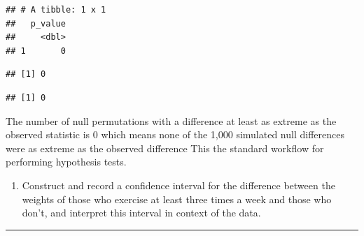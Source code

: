 \documentclass[
]{article}
\newenvironment{Shaded}{\begin{snugshade}}{\end{snugshade}}
\newcommand{\DecValTok}[1]{\textcolor[rgb]{0.00,0.00,0.81}{#1}}
\newcommand{\FunctionTok}[1]{\textcolor[rgb]{0.13,0.29,0.53}{\textbf{#1}}}
\newcommand{\NormalTok}[1]{#1}
\newcommand{\SpecialCharTok}[1]{\textcolor[rgb]{0.81,0.36,0.00}{\textbf{#1}}}
\providecommand{\tightlist}{%
  \setlength{\itemsep}{0pt}\setlength{\parskip}{0pt}}
\begin{document}
\begin{verbatim}
## # A tibble: 1 x 1
##   p_value
##     <dbl>
## 1       0
\end{verbatim}

\begin{Shaded}
\end{Shaded}

\begin{verbatim}
## [1] 0
\end{verbatim}

\begin{Shaded}
\end{Shaded}

\begin{verbatim}
## [1] 0
\end{verbatim}

The number of null permutations with a difference at least as extreme as
the observed statistic is 0 which means none of the 1,000 simulated null
differences were as extreme as the observed difference This the standard
workflow for performing hypothesis tests.

\begin{enumerate}
\def\labelenumi{\arabic{enumi}.}
\setcounter{enumi}{6}
\tightlist
\item
  Construct and record a confidence interval for the difference between
  the weights of those who exercise at least three times a week and
  those who don't, and interpret this interval in context of the data.
\end{enumerate}

\begin{center}\rule{0.5\linewidth}{0.5pt}\end{center}
\end{document}
